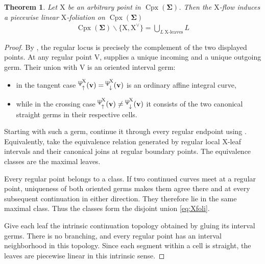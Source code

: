 \documentclass[11pt,reqno]{amsart}
\newcommand{\Neptune}{\mathord{\text{\tikz[baseline=-.5ex,scale=.13]{\draw[line width=.45pt] (0,0)--(0,1.8) (-.6,1.8)--(-.6,.8)--(.6,.8)--(.6,1.8) (-.35,.35)--(.35,.35);}}}}
\theoremstyle{plain}
\newtheorem{theorem}{Theorem}[section]
\theoremstyle{definition}
\numberwithin{equation}{section}
\newcommand\<{\langle}
\renewcommand\>{\rangle}
\newcommand{\on}[1]{\operatorname{#1}}
\def\CCx{\on{Cpx}}   %
\def\vv{\mathbf{v}}
\def\sink{X}
\newcommand{\ccpt}[1]{\mathrm{#1}}%
\def\xevo{\ccpt{X}}%
\def\seeds{\mathbf{\Sigma}}
\newcommand{\suppd}[1]{\operatorname{\Neptune}_{\downarrow}^{#1}}
\newcommand{\suppu}[1]{\operatorname{\Neptune}_{\uparrow}^{#1}}
\newcommand{\DT}[1]{#1^{\vee}}
\def\Xevo{\DT{\ccpt{X}}}
\begin{document}
\begin{theorem}\label{thm:X-foli}
    Let $\xevo$ be an arbitrary point in $\CCx(\seeds)$. Then the $\xevo$-\EVO flow induces a piecewise linear $\xevo$-foliation on $\CCx(\seeds)$
    \begin{gather}\label{eq:Xfoli}
        \CCx(\seeds)\backslash\{\xevo,\Xevo\}=\bigcup_{L~\xevo\text{-leaves}} L
    \end{gather}
\end{theorem}

\begin{proof}
By , the regular locus is precisely the complement of the two displayed points. 
At any regular point $\ccpt{V}$,  supplies a unique incoming and a unique outgoing germ. 
Their union with $\ccpt{V}$ is an oriented interval germ: 
\begin{itemize}
    \item in the tangent case $\suppu{\xevo}(\vv)=\suppd{\xevo}(\vv)$ is an ordinary affine integral curve,
    \item while in the crossing case $\suppu{\xevo}(\vv)\ne\suppd{\xevo}(\vv)$ it consists of the two canonical straight germs in their respective cells.
\end{itemize}

Starting with such a germ, continue it through every regular endpoint using . 
Equivalently, take the equivalence relation generated by regular local $\xevo$-leaf intervals and their canonical joins at regular boundary points.
The equivalence classes are the maximal leaves. 

Every regular point belongs to a class. 
If two continued curves meet at a regular point, uniqueness of both oriented germs makes them agree there and at every subsequent continuation in either direction. 
They therefore lie in the same maximal class. 
Thus the classes form the disjoint union \eqref{eq:Xfoli}. 

Give each leaf the intrinsic continuation topology obtained by gluing its interval germs. 
There is no branching, and every regular point has an interval neighborhood in this topology. 
Since each segment within a cell is straight, the leaves are piecewise linear in this intrinsic sense.
\end{proof}
\end{document}

